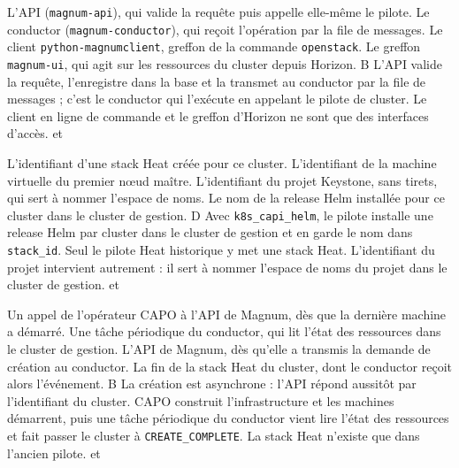   {L'API (\texttt{magnum-api}), qui valide la requête puis appelle elle-même le pilote.}
  {Le conductor (\texttt{magnum-conductor}), qui reçoit l'opération par la file de messages.}
  {Le client \texttt{python-magnumclient}, greffon de la commande \texttt{openstack}.}
  {Le greffon \texttt{magnum-ui}, qui agit sur les ressources du cluster depuis Horizon.}
  {B}
  {L'API valide la requête, l'enregistre dans la base et la transmet au conductor par la file de messages ; c'est le conductor qui l'exécute en appelant le pilote de cluster. Le client en ligne de commande et le greffon d'Horizon ne sont que des interfaces d'accès.}
  { et }

  {L'identifiant d'une stack Heat créée pour ce cluster.}
  {L'identifiant de la machine virtuelle du premier nœud maître.}
  {L'identifiant du projet Keystone, sans tirets, qui sert à nommer l'espace de noms.}
  {Le nom de la release Helm installée pour ce cluster dans le cluster de gestion.}
  {D}
  {Avec \texttt{k8s\_capi\_helm}, le pilote installe une release Helm par cluster dans le cluster de gestion et en garde le nom dans \texttt{stack\_id}. Seul le pilote Heat historique y met une stack Heat. L'identifiant du projet intervient autrement : il sert à nommer l'espace de noms du projet dans le cluster de gestion.}
  { et }

  {Un appel de l'opérateur CAPO à l'API de Magnum, dès que la dernière machine a démarré.}
  {Une tâche périodique du conductor, qui lit l'état des ressources dans le cluster de gestion.}
  {L'API de Magnum, dès qu'elle a transmis la demande de création au conductor.}
  {La fin de la stack Heat du cluster, dont le conductor reçoit alors l'événement.}
  {B}
  {La création est asynchrone : l'API répond aussitôt par l'identifiant du cluster. CAPO construit l'infrastructure et les machines démarrent, puis une tâche périodique du conductor vient lire l'état des ressources et fait passer le cluster à \texttt{CREATE\_COMPLETE}. La stack Heat n'existe que dans l'ancien pilote.}
  { et }

